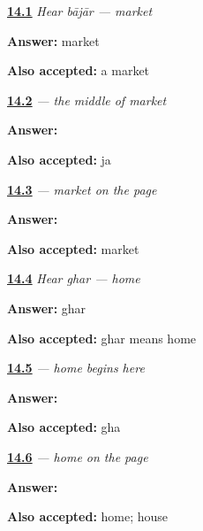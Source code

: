 \noindent\begin{minipage}[t]{\linewidth}
\raggedright
\hyperlink{review-MW-C10-hear-bajar-meaning}{\textbf{14.1}} \emph{Hear \emph{bājār} — market}\par
\small \textbf{Answer:} market\par
\footnotesize \textbf{Also accepted:} a market
\end{minipage}\par\medskip

\noindent\begin{minipage}[t]{\linewidth}
\raggedright
\hyperlink{review-MW-W10-ja-write}{\textbf{14.2}} \emph{ — the middle of market}\par
\small \textbf{Answer:} \par
\footnotesize \textbf{Also accepted:}  ja
\end{minipage}\par\medskip

\noindent\begin{minipage}[t]{\linewidth}
\raggedright
\hyperlink{review-MW-C10-bajar-dictation}{\textbf{14.3}} \emph{ — market on the page}\par
\small \textbf{Answer:} \par
\footnotesize \textbf{Also accepted:}  market
\end{minipage}\par\medskip

\noindent\begin{minipage}[t]{\linewidth}
\raggedright
\hyperlink{review-MW-C10-hear-ghar-meaning}{\textbf{14.4}} \emph{Hear \emph{ghar} — home}\par
\small \textbf{Answer:} ghar\par
\footnotesize \textbf{Also accepted:} ghar means home
\end{minipage}\par\medskip

\noindent\begin{minipage}[t]{\linewidth}
\raggedright
\hyperlink{review-MW-W10-gha-write}{\textbf{14.5}} \emph{ — home begins here}\par
\small \textbf{Answer:} \par
\footnotesize \textbf{Also accepted:}  gha
\end{minipage}\par\medskip

\noindent\begin{minipage}[t]{\linewidth}
\raggedright
\hyperlink{review-MW-C10-ghar-dictation}{\textbf{14.6}} \emph{ — home on the page}\par
\small \textbf{Answer:} \par
\footnotesize \textbf{Also accepted:}  home;  house
\end{minipage}\par\medskip

